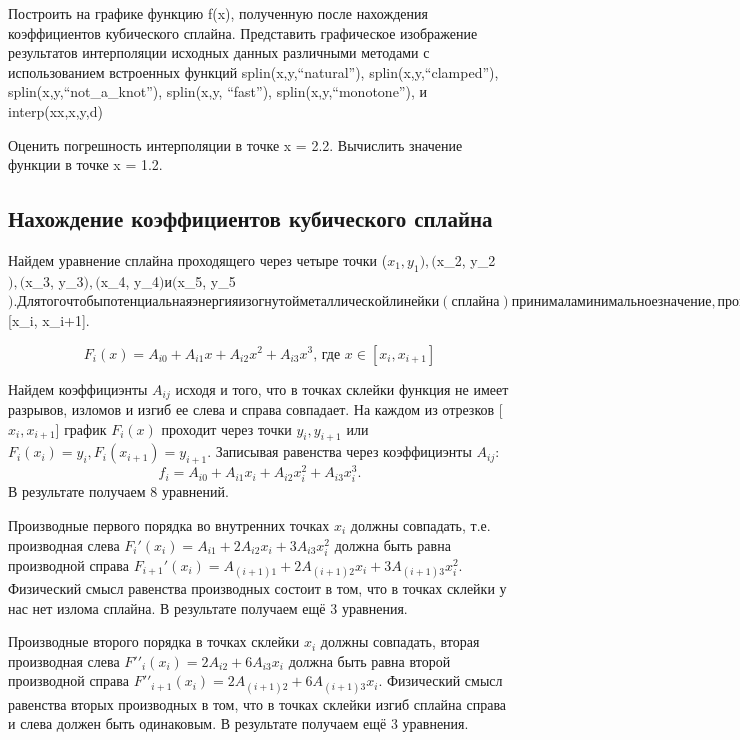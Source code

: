 \documentclass[russian,utf8,nocolumnxxxi,nocolumnxxxii]{eskdtext}
\begin{document}
 Построить на графике функцию f(x), полученную после нахождения коэффициентов кубического сплайна. Представить графическое изображение результатов интерполяции исходных данных различными методами с использованием встроенных функций splin(x,y,“natural”), splin(x,y,“clamped”), splin(x,y,“not\_a\_knot”), splin(x,y, “fast”), splin(x,y,“monotone”), и interp(xx,x,y,d)
 
Оценить погрешность интерполяции в точке x = 2.2. Вычислить значение функции в точке x = 1.2.

\subsection{Нахождение коэффициентов кубического сплайна}

Найдем уравнение сплайна проходящего через четыре точки
($x_1, y_1), ($x_2, y_2$), ($x_3, y_3$), ($x_4, y_4$) и ($x_5, y_5$). Для того чтобы потенциальная энергия изогнутой металлической линейки (сплайна) принимала минимальное значение, производная четвертого порядка должна быть равна нулю, значит мы можем представить сплайн полиномом третьей степени на каждом отрезк $[x_i, x_{i+1}].

$$
F_i(x)=A_{i0}+A_{i1}x+A_{i2}x^2+A_{i3}x^3 \text{, где } x \in [x_i, x_{i+1}]
$$

Найдем коэффициэнты $A_{ij}$ исходя и того, что в точках склейки функция не имеет разрывов, изломов и изгиб ее слева и справа совпадает. На каждом из отрезков [$x_i, x_{i+1}$] график $F_i(x)$ проходит через точки $y_i, y_{i+1}$ или $F_i(x_i)=y_i, F_i(x_{i+1})=y_{i+1}$. Записывая равенства через коэффициэнты $A_{ij}$:
\[
f_i=A_{i0}+A_{i1}x_i+A_{i2}x^2_i+A_{i3}x^3_i.
\]
В результате  получаем 8 уравнений. 

Производные первого порядка во внутренних точках $x_i$ должны совпадать, т.е. производная слева $F_i'(x_i) =A_{i1}+2A_{i2}x_i+3A_{i3}x^2_i$ должна быть равна производной справа $F_{i+1}'(x_i)  =A_{(i+1)1}+ 2A_{(i+1)2}x_i+ 3A_{(i+1)3}x^2_i$. Физический смысл равенства производных состоит в том, что в точках склейки у нас нет излома сплайна.
В результате  получаем ещё 3 уравнения.

Производные второго порядка в точках склейки $x_i$ должны совпадать, вторая производная слева $F′′_i(x_i)  =  2A_{i2}+6A_{i3}x_i $ должна быть равна второй производной справа $F′′_{i+1}(x_i) = 2A_{(i+1)2}+ 6A_{(i+1)3}x_i$. Физический смысл равенства вторых производных в том, что в точках склейки изгиб сплайна справа и слева должен быть одинаковым. 
В результате  получаем ещё 3 уравнения.
\end{document}
